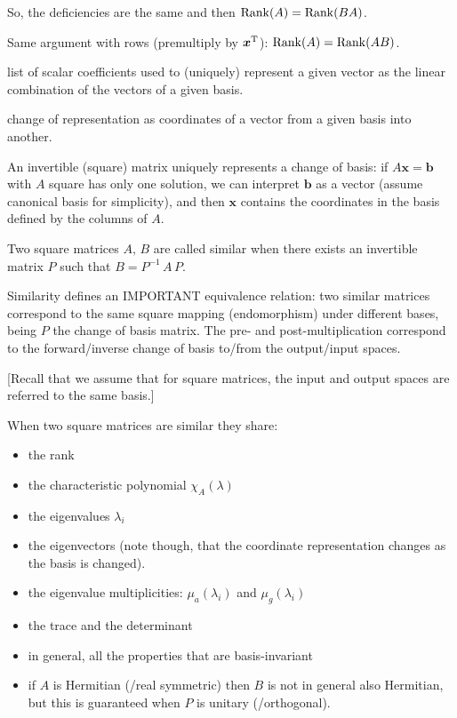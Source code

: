 \documentclass[
  12pt,
  paper=a4,
]{scrartcl} %
\begin{document}
\begin{description}
[Shorter proof: $B A\bm x = \bm 0 \implies B^{-1}B A\bm x = B^{-1} \bm 0 \implies A\bm x = \bm 0$]

So, the deficiencies are the same and then $\operatorname{Rank}(A) = \operatorname{Rank}(BA)$.

Same argument with rows (premultiply by $\bm x^{\mathrm{T}}$): $\operatorname{Rank}(A) = \operatorname{Rank}(AB)$.

\item[Coordinates of a vector in a basis:] list of scalar coefficients used to (uniquely) represent a given vector as the linear combination of the vectors of a given basis.

\item[Change of basis:] change of representation as coordinates of a vector from a given basis into another.

An invertible (square) matrix uniquely represents a change of basis: if $A\bm x = \bm b$ with $A$ square has only one solution, we can interpret $\bm b$ as a vector (assume canonical basis for simplicity), and then $\bm x$ contains the coordinates in the basis defined by the columns of $A$.

\item[Similar matrices:] Two square matrices $A,\,B$ are called similar when there exists an invertible matrix $P$ such that $B= P^{-1}\, A\, P$.

Similarity defines an IMPORTANT equivalence relation: two similar matrices correspond to the same square mapping (endomorphism) under different bases, being $P$ the change of basis matrix. The pre- and post-multiplication correspond to the forward/inverse change of basis to/from the output/input spaces.

[Recall that we assume that for square matrices, the input and output spaces are referred to the same basis.]

When two square matrices are similar they share:
\begin{itemize}
    \item the rank
    \item the characteristic polynomial $\chi_A(\lambda)$
    \item the eigenvalues $\lambda_i$
    \item the eigenvectors (note though, that the coordinate representation changes as the basis is changed).
    \item the eigenvalue multiplicities: $\mu_a(\lambda_i)$ and $\mu_g(\lambda_i)$
    \item the trace and the determinant
    \item in general, all the properties that are basis-invariant
    \item if $A$ is Hermitian (/real symmetric) then $B$ is not in general also Hermitian, but this is guaranteed when $P$ is unitary (/orthogonal).
\end{itemize}


\end{description}
\end{document}
